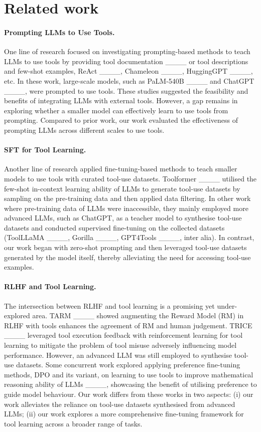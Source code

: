 \section{Related work}
\paragraph{Prompting LLMs to Use Tools.} 
One line of research focused on investigating prompting-based methods to teach LLMs to use tools by providing tool documentation ____ or tool descriptions and few-shot examples, \eg ReAct ____, Chameleon ____, HuggingGPT ____, etc. In these work, large-scale models, such as PaLM-540B ____ and ChatGPT ____, were prompted to use tools. These studies suggested the feasibility and benefits of integrating LLMs with external tools. However, a gap remains in exploring whether a smaller model can effectively learn to use tools from prompting. Compared to prior work, our work evaluated the effectiveness of prompting LLMs across different scales to use tools. 

\paragraph{SFT for Tool Learning.} 
Another line of research applied fine-tuning-based methods to teach smaller models to use tools with curated tool-use datasets. Toolformer ____ utilised the few-shot in-context learning ability of LLMs to generate tool-use datasets by sampling on the pre-training data and then applied data filtering. In other work where pre-training data of LLMs were inaccessible, they mainly employed more advanced LLMs, such as ChatGPT, as a teacher model to synthesise tool-use datasets and conducted supervised fine-tuning on the collected datasets (\eg ToolLLaMA ____, Gorilla ____, GPT4Tools ____, inter alia). In contrast, our work began with zero-shot prompting and then leveraged tool-use datasets generated by the model itself, thereby alleviating the need for accessing tool-use examples. 

\paragraph{RLHF and Tool Learning.} 
The intersection between RLHF and tool learning is a promising yet under-explored area. TARM ____ showed augmenting the Reward Model (RM) in RLHF with tools enhances the agreement of RM and human judgement. TRICE ____ leveraged tool execution feedback with reinforcement learning for tool learning to mitigate the problem of tool misuse adversely influencing model performance. However, an advanced LLM was still employed to synthesise tool-use datasets. Some concurrent work explored applying preference fine-tuning methods, \eg DPO and its variant, on learning to use tools to improve mathematical reasoning ability of LLMs ____, showcasing the benefit of utilising preference to guide model behaviour. Our work differs from these works in two aspects: (i) our work alleviates the reliance on tool-use datasets synthesised from advanced LLMs; (ii) our work explores a more comprehensive fine-tuning framework for tool learning across a broader range of tasks.





